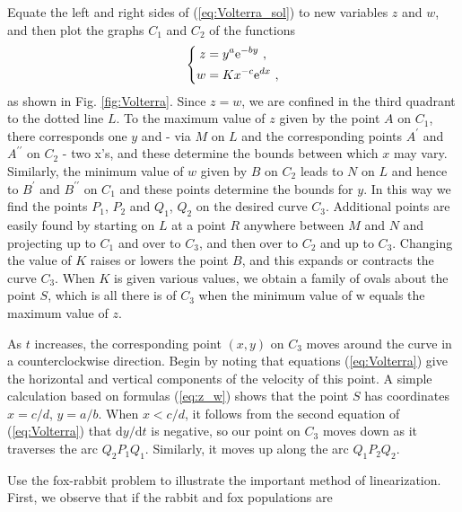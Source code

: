 \documentclass[11pt,a4paper]{article}
\newcommand{\dif}{\mathrm{d}}
\begin{document}
Equate the left and right sides of (\ref{eq:Volterra_sol}) to new variables $z$ and $w$, and then plot the graphs $C_1$ and $C_2$ of the functions
\begin{equation}
\left\{
\begin{aligned}
z &= y^a {\rm e}^{-by} ~, \\
w &= K x^{-c} {\rm e}^{dx} ~,
\end{aligned}
\right.
\label{eq:z_w}
\end{equation}
as shown in Fig. \ref{fig:Volterra}. Since $z=w$, we are confined in the third quadrant to the dotted line $L$. To the maximum value of $z$ given by the point $A$ on $C_1$, there corresponds one $y$ and - via $M$ on $L$ and the corresponding points $A^\prime$ and  $A^{\prime \prime}$ on $C_2$ - two x's, and these determine the bounds between which $x$ may vary. Similarly, the minimum value of $w$ given by $B$ on $C_2$ leads to $N$ on $L$ and hence to $B^\prime$ and $B^{\prime \prime}$ on $C_1$ and these points determine the bounds for $y$. In this way we find the points $P_1$, $P_2$ and $Q_1$, $Q_2$ on the desired curve $C_3$. Additional points are easily found by starting on $L$ at a point $R$ anywhere between $M$ and $N$ and projecting up to $C_1$ and over to $C_3$, and then over to $C_2$ and up to $C_3$. Changing the value of $K$ raises or lowers the point $B$, and this expands or contracts the curve $C_3$. When $K$ is given various values, we obtain a family of ovals about the point $S$, which is all there is of $C_3$ when the minimum value of w equals the maximum value of $z$.

As $t$ increases, the corresponding point $(x, y)$ on $C_3$ moves around the curve in a counterclockwise direction. Begin by noting that equations (\ref{eq:Volterra}) give the horizontal and vertical components of the velocity of this point. A simple calculation based on formulas (\ref{eq:z_w}) shows that the point $S$ has coordinates $x=c/d$, $y=a/b$. When $x < c/d$, it follows from the second equation of (\ref{eq:Volterra}) that $\dif y/\dif t$ is negative, so our point on $C_3$ moves down as it traverses the arc $Q_2 P_1 Q_1$. Similarly, it moves up along the arc $Q_1 P_2 Q_2$.


Use the fox-rabbit problem to illustrate the important method of linearization. First, we observe that if the rabbit and fox populations are
\end{document}

